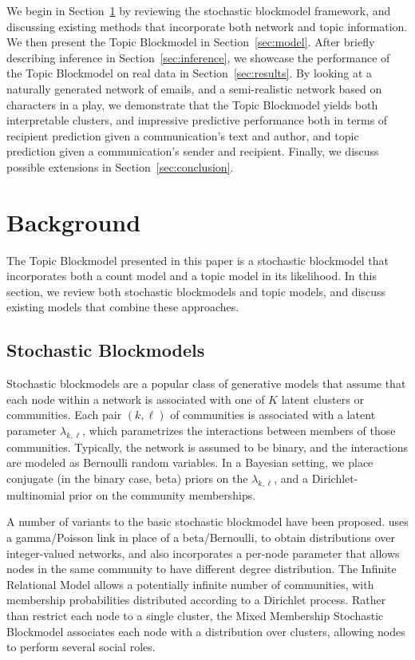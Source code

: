     We begin in Section~\ref{sec:background} by reviewing the stochastic blockmodel framework, and discussing existing methods that incorporate both network and topic information. We then present the Topic Blockmodel in Section~\ref{sec:model}. After briefly describing inference in Section~\ref{sec:inference}, we showcase the performance
    of the Topic Blockmodel on real data in Section~\ref{sec:results}. By looking at a naturally generated network of emails, and a semi-realistic network based on characters in a play, we demonstrate that the Topic Blockmodel yields both interpretable clusters, and impressive predictive performance  both in terms of recipient prediction given a communication's text and author, and topic prediction given a communication's sender and recipient. Finally, we discuss possible extensions in Section~\ref{sec:conclusion}.

\section{Background}\label{sec:background}

    The Topic Blockmodel presented in this paper is a stochastic blockmodel that incorporates both a count model and a topic model in its likelihood. In this section, we review both stochastic blockmodels and topic models, and discuss existing models that combine these approaches.
    
    \subsection{Stochastic Blockmodels}
    
        Stochastic blockmodels \citep{Wang:Wong:1987,Snijders:Nowicki:1997} are a popular class of generative models that assume that each node within a network is associated with one of $K$ latent clusters or communities. Each pair $(k,\ell)$ of communities is associated with a latent parameter $\lambda_{k,\ell}$, which parametrizes the interactions between members of those communities. Typically, the network is assumed to be binary, and the interactions are modeled as Bernoulli random variables. In a Bayesian setting, we place conjugate (in the binary case, beta) priors on the $\lambda_{k,\ell}$, and a Dirichlet-multinomial prior on the community memberships.
    
        A number of variants to the basic stochastic blockmodel have been proposed. \citep{Karrer:Newman:2011} uses a gamma/Poisson link in place of a beta/Bernoulli, to obtain distributions over integer-valued networks, and also incorporates a per-node parameter that allows nodes in the same community to have different degree distribution. The Infinite Relational Model \citep{irm} allows a potentially infinite number of communities, with membership probabilities distributed according to a Dirichlet process. Rather than restrict each node to a single cluster, the Mixed Membership Stochastic Blockmodel \citep{Airoldi:Blei:Fienberg:Xing:2008} associates each node with a distribution over clusters, allowing nodes to perform several social roles.
        

